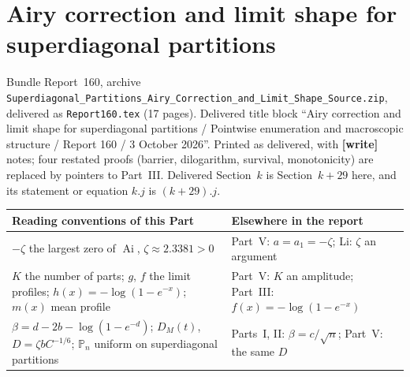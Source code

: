 \documentclass[11pt,letterpaper]{article}
\numberwithin{equation}{section}
\theoremstyle{remark}\newtheorem{remark}[theorem]{Remark}
\newcommand{\file}[1]{\nolinkurl{#1}}
\newcommand{\partsource}[1]{\par\noindent\begin{minipage}{\textwidth}\small #1\end{minipage}\par\medskip}
\begin{document}
\part{Airy correction and limit shape for superdiagonal partitions}\label{dgp:airy:part}
\partsource{Bundle Report~160, archive \file{Superdiagonal_Partitions_Airy_Correction_and_Limit_Shape_Source.zip}, delivered as \file{Report160.tex} (17 pages). Delivered title block ``Airy correction and limit shape for superdiagonal partitions / Pointwise enumeration and macroscopic structure / Report 160 / 3 October 2026''. Printed as delivered, with \textbf{[write]} notes; four restated proofs (barrier, dilogarithm, survival, monotonicity) are replaced by pointers to Part~III. Delivered Section~$k$ is Section~$k+29$ here, and its statement or equation $k.j$ is $(k+29).j$.}
\begin{center}
\small
\begin{tabular}{@{}>{\raggedright\arraybackslash}p{} >{\raggedright\arraybackslash}p{}@{}}
\toprule
Reading conventions of this Part & Elsewhere in the report\\
\midrule
$-\zeta$ the largest zero of $\operatorname{Ai}$, $\zeta\approx2.3381>0$ & Part~V: $a=a_1=-\zeta$; Li: $\zeta$ an argument\\
$K$ the number of parts; $g$, $f$ the limit profiles; $h(x)=-\log(1-e^{-x})$; $m(x)$ mean profile & Part~V: $K$ an amplitude; Part~III: $f(x)=-\log(1-e^{-x})$\\
$\beta=d-2b-\log(1-e^{-d})$; $D_M(t)$, $D=\zeta bC^{-1/6}$; $\mathbb P_n$ uniform on superdiagonal partitions & Parts~I, II: $\beta=c/\sqrt n$; Part~V: the same $D$\\
\bottomrule
\end{tabular}
\end{center}
\end{document}
